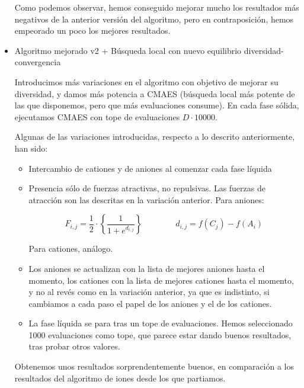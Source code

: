 \documentclass[a4paper,11pt]{article}
\begin{document}
\begin{itemize}
 
 Como podemos observar, hemos conseguido mejorar mucho los resultados más negativos de la anterior versión del algoritmo, pero
 en contraposición, hemos empeorado un poco los mejores resultados.
 
 \item Algoritmo mejorado v2 + Búsqueda local con nuevo equilibrio diversidad-convergencia
 
 Introducimos más variaciones en el algoritmo con objetivo de mejorar su diversidad, y damos más potencia a CMAES (búsqueda
 local más potente de las que disponemos, pero que más evaluaciones consume). En cada fase sólida, ejecutamos CMAES con tope
 de evaluaciones $D \cdot 10000$. 
 
 Algunas de las variaciones introducidas, respecto a lo descrito anteriormente, han sido:
 \begin{itemize}
  \item Intercambio de cationes y de aniones al comenzar cada fase líquida
  \item Presencia sólo de fuerzas atractivas, no repulsivas. Las fuerzas de atracción son las descritas en la variación anterior.
  Para aniones: 
  
     $$F_{i,j} = \frac{1}{2} \cdot \left\{\frac{1}{1+e^{d_{i,j}}}\right\} \qquad \qquad d_{i,j} = {f(C_j) - f(A_i)}$$ 
     
  Para cationes, análogo.
  
  \item Los aniones se actualizan con la lista de mejores aniones hasta el momento, los cationes con la lista de mejores cationes
  hasta el momento, y no al revés como en la variación anterior, ya que es indistinto, si cambiamos a cada paso el papel
  de los aniones y el de los cationes.
  
  \item La fase líquida se para tras un tope de evaluaciones. Hemos seleccionado 1000 evaluaciones como tope, que parece
  estar dando buenos resultados, tras probar otros valores.
 \end{itemize}
 
  Obtenemos unos resultados sorprendentemente buenos, en comparación a los resultados del
 algoritmo de iones desde los que partiamos. 
 

\end{itemize}
\end{document}
